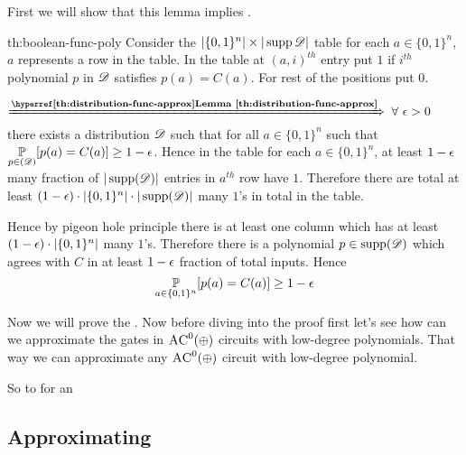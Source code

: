 First we will show that this lemma implies . 

\begin{proof-of-lemma}{th:boolean-func-poly}
	Consider the $|\{0,1\}^n|\times |\operatorname{supp}{\mathscr{D}}|$ table for each $a\in\{0,1\}^n$, $a$ represents a row in the table. In the table at $(a,i)^{th}$ entry put $1$ if $i^{th}$ polynomial $p$ in ${\mathscr{D}}$ satisfies $p(a)=C(a)$. For rest of the positions put $0$. \parinf\vspace*{2mm}
	
	$\xRightarrow{\textbf{\lmref{distribution-func-approx}}}$ $\forall\ \epsilon>0$ there exists a distribution ${\mathscr{D}}$ such that for all $a\in\{0,1\}^n$ such that $\underset{p\in({\mathscr{D}})}{\mathbb{P}}[p(a)=C(a)]\geq 1-\epsilon$. Hence in the table for each $a\in\{0,1\}^n$, at least $1-\epsilon$ many fraction of $|\operatorname{supp}({\mathscr{D}})|$ entries in $a^{th}$ row have $1$. Therefore there are total at least $(1-\epsilon)\cdot |\{0,1\}^n|\cdot |\operatorname{supp}({\mathscr{D}})|$ many $1$'s in total in the table. \parinn
	
	Hence by pigeon hole principle there is at least one column which has at least $(1-\epsilon)\cdot |\{0,1\}^n|$ many $1$'s. Therefore there is a polynomial $p\in\operatorname{supp}({\mathscr{D}})$ which agrees with $C$ in at least $1-\epsilon$  fraction of total inputs. Hence $${\underset{a\in\{0,1\}^n}{\mathbb{P}}[p(a)=C(a)]\geq 1-\epsilon}$$
\end{proof-of-lemma}

Now we will prove the . Now before diving into the proof first let's see how can we approximate the gates in $\textsc{AC}^0(\oplus)$ circuits with low-degree polynomials. That way we can approximate any $\textsc{AC}^0(\oplus)$ circuit with low-degree polynomial.

So to for an 

\subsection{Approximating }